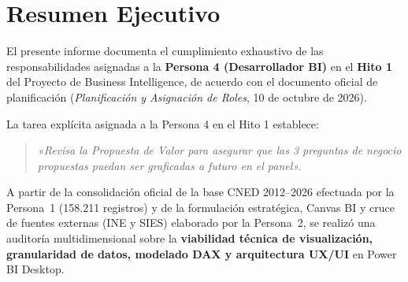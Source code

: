 \documentclass[11pt,a4paper]{article}
\begin{document}
\tableofcontents
\newpage

\section{Resumen Ejecutivo}
El presente informe documenta el cumplimiento exhaustivo de las responsabilidades asignadas a la \textbf{Persona 4 (Desarrollador BI)} en el \textbf{Hito 1} del Proyecto de Business Intelligence, de acuerdo con el documento oficial de planificación (\emph{Planificación y Asignación de Roles}, 10 de octubre de 2026).

La tarea explícita asignada a la Persona 4 en el Hito 1 establece:
\begin{quote}
\textit{«Revisa la Propuesta de Valor para asegurar que las 3 preguntas de negocio propuestas puedan ser graficadas a futuro en el panel».}
\end{quote}

A partir de la consolidación oficial de la base CNED 2012--2026 efectuada por la Persona~1 (158.211 registros) y de la formulación estratégica, Canvas BI y cruce de fuentes externas (INE y SIES) elaborado por la Persona~2, se realizó una auditoría multidimensional sobre la \textbf{viabilidad técnica de visualización, granularidad de datos, modelado DAX y arquitectura UX/UI} en Power BI Desktop.
\end{document}
